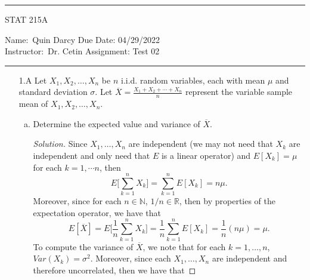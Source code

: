\documentclass[12pt]{article}
\newenvironment{solution}
{\renewcommand\qedsymbol{$\blacksquare$}\begin{proof}[Solution]}
{\end{proof}}
\begin{document}
    \thispagestyle{empty}\hrule

    \begin{center}
        \vspace{.4cm} { \large STAT 215A}
    \end{center}
    {Name:\ Quin Darcy \hspace{\fill} Due Date: 04/29/2022   \\
    { Instructor:}\ Dr. Cetin \hspace{\fill} Assignment:
    Test 02 \\ \hrule}

    \begin{enumerate}
        \item[1.A] Let $X_1, X_2, \dots, X_n$ be $n$ i.i.d. random variables,
            each with mean $\mu$ and standard deviation $\sigma$. Let
            $\overline{X}=\frac{X_1+X_2+\cdots+X_n}{n}$ represent the variable
            sample mean of $X_1, X_2, \dots, X_n$. 
            \begin{enumerate}[(a)]
                \item Determine the expected value and variance of
                    $\overline{X}$. 
                    \begin{solution}
                        Since $X_1, \dots, X_n$ are independent (we may not
                        need that $X_k$ are independent and only need that $E$
                        is a linear operator) and
                        $E[X_k]=\mu$ for each $k=1, \dotsm n$, then 
                        \begin{equation*}
                            E\bigg[\sum_{k=1}^{n}X_k\bigg]=\sum_{k=1}^{n}E[X_k]=n\mu.
                        \end{equation*}
                        Moreover, since for each $n\in\mathbb{N}$,
                        $1/n\in\mathbb{R}$, then by properties of the
                        expectation operator, we have that 
                        \begin{equation*}
                            E[\overline{X}]=E\bigg[\frac{1}{n}\sum_{k=1}^{n}X_k\bigg]
                            =\frac{1}{n}\sum_{k=1}^{n}E[X_k]=\frac{1}{n}(n\mu)=\mu. 
                        \end{equation*}
                        To compute the variance of $\overline{X}$, we note that
                        for each $k=1, \dots, n$, $Var(X_k)=\sigma^2$.
                        Moreover, since each $X_1, \dots, X_n$ are independent
                        and therefore uncorrelated, then we have that 

\end{solution}
\end{enumerate}
\end{enumerate}
\end{document}
